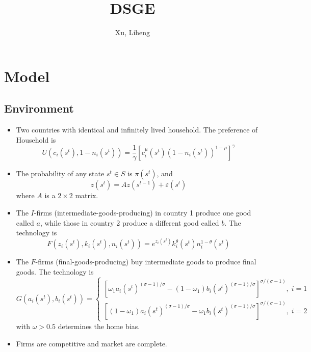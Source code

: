 \documentclass[11pt,a4paper]{article}
\title{DSGE}
\author{Xu, Liheng}
\date{}
\begin{document}
\maketitle
\section{Model}
\subsection{Environment}

\begin{itemize}
	\item Two countries with identical and infinitely lived household. The preference of Household is
	    \begin{equation}
	        U(c_i(s^t),1-n_i(s^t))=\frac{1}{\gamma}{[c_i^\mu(s^t){(1-n_i(s^t))}^{1-\mu}]}^\gamma
	    \end{equation}
	    
	\item The probability of any state $s^t \in S$ is $\pi(s^t)$, and
            \begin{equation}
               z(s^t)=Az(s^{t-1})+\varepsilon(s^t)
            \end{equation}
    where $A$ is a $2\times2$ matrix.
    \item The $I$-firms (intermediate-goods-producing) in country 1 produce one good called $a$, while those in country 2 produce a different good called $b$. The technology is
        \begin{equation}
            F(z_i(s^t),k_i(s^t),n_i(s^t))=e^{z_i(s^t)}k_i^\theta(s^t)n_i^{1-\theta}(s^t)
        \end{equation}
    \item The $F$-firms (final-goods-producing) buy intermediate goods to produce final goods. The technology is
        \begin{equation}
        G(a_i(s^t),b_i(s^t))=\left\{   
        \begin{array}{ll}
        	{[{\omega_1a_i(s^t)}^{(\sigma-1)/\sigma}-{(1-\omega_1)b_i(s^t)}^{(\sigma-1)/\sigma}   ]}^{\sigma/(\sigma-1)},\; i=1\\
        	{[{(1-\omega_1)a_i(s^t)}^{(\sigma-1)/\sigma}-{\omega_1b_i(s^t)}^{(\sigma-1)/\sigma}   ]}^{\sigma/(\sigma-1)},\; i=2
        \end{array}
         \right.
        \end{equation}
        with $\omega>0.5$ determines the home bias.
    \item Firms are competitive and market are complete.
	
\end{itemize}
\end{document}
